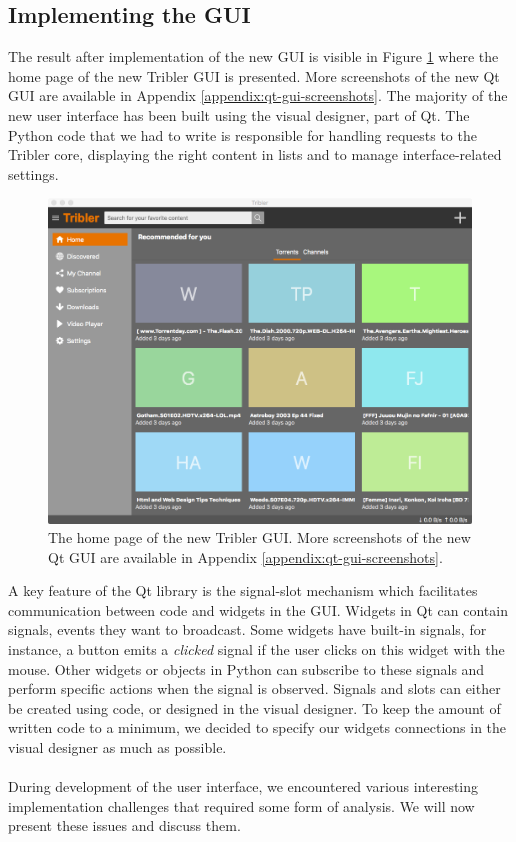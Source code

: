 \subsection{Implementing the GUI}
The result after implementation of the new GUI is visible in Figure \ref{fig:new-gui-1} where the home page of the new Tribler GUI is presented. More screenshots of the new Qt GUI are available in Appendix \ref{appendix:qt-gui-screenshots}. The majority of the new user interface has been built using the visual designer, part of Qt. The Python code that we had to write is responsible for handling requests to the Tribler core, displaying the right content in lists and to manage interface-related settings.\\

\begin{figure}[t]
	\centering
	\includegraphics[width=1.0\columnwidth]{images/improving_qa/newgui1}
	\caption{The home page of the new Tribler GUI. More screenshots of the new Qt GUI are available in Appendix \ref{appendix:qt-gui-screenshots}.}
	\label{fig:new-gui-1}
\end{figure}

A key feature of the Qt library is the signal-slot mechanism which facilitates communication between code and widgets in the GUI. Widgets in Qt can contain signals, events they want to broadcast. Some widgets have built-in signals, for instance, a button emits a \emph{clicked} signal if the user clicks on this widget with the mouse. Other widgets or objects in Python can subscribe to these signals and perform specific actions when the signal is observed. Signals and slots can either be created using code, or designed in the visual designer. To keep the amount of written code to a minimum, we decided to specify our widgets connections in the visual designer as much as possible.\\\\
During development of the user interface, we encountered various interesting implementation challenges that required some form of analysis. We will now present these issues and discuss them.

